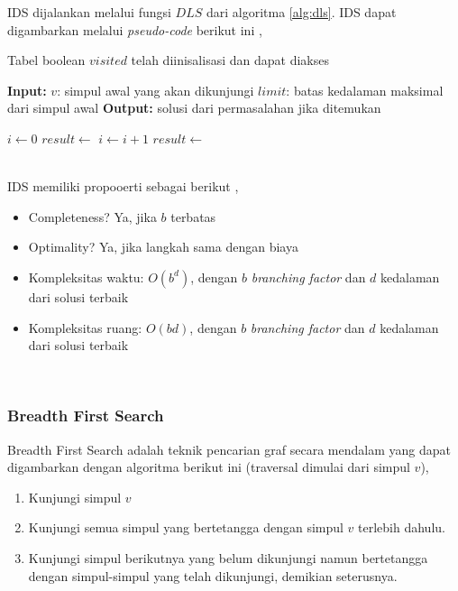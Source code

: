 \documentclass[12pt,a4paper]{article}
\begin{document}
IDS dijalankan melalui fungsi $DLS$ dari algoritma \ref{alg:dls}. IDS dapat digambarkan melalui \textit{pseudo-code} berikut ini \cite{stima-graph-2},
\begin{algorithm}[H]
    \caption{Mengunjungi seluruh simpul graf dengan IDS} \label{alg:ids}
    \begin{algorithmic}
        \Require Tabel boolean $visited$ telah diinisalisasi dan dapat diakses
        \Statex

            \State \textbf{Input:} \; $v$: simpul awal yang akan dikunjungi
            \State \qquad \qquad $limit$: batas kedalaman maksimal dari simpul awal
            \State \textbf{Output:} solusi dari permasalahan jika ditemukan
            \Statex

            \State $i \gets 0$
            \State $result \gets $ 
                \State $i \gets i+1$
                \State $result \gets $ 
            \EndWhile
            \State {}
        \EndFunction
    \end{algorithmic}
\end{algorithm} \\


IDS memiliki propooerti sebagai berikut \cite{stima-graph-2},
\begin{itemize}
    \item Completeness? Ya, jika $b$ terbatas
    \item Optimality? Ya, jika langkah sama dengan biaya
    \item Kompleksitas waktu: $O(b^d)$, dengan $b$ \textit{branching factor} dan $d$ kedalaman dari solusi terbaik
    \item Kompleksitas ruang: $O(bd)$, dengan $b$ \textit{branching factor} dan $d$ kedalaman dari solusi terbaik
\end{itemize} \\


\subsubsection{Breadth First Search}

Breadth First Search adalah teknik pencarian graf secara mendalam yang dapat digambarkan dengan algoritma berikut ini (traversal dimulai dari simpul $v$),
\begin{enumerate}
    \item Kunjungi simpul $v$
    \item Kunjungi semua simpul yang bertetangga dengan simpul $v$ terlebih dahulu.
    \item Kunjungi simpul berikutnya yang belum dikunjungi namun bertetangga dengan simpul-simpul yang telah dikunjungi, demikian seterusnya.
\end{enumerate} \\
\end{document}
